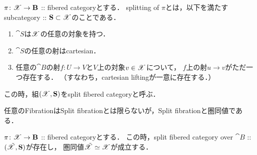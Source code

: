 \documentclass[a4paper, dvipdfmx]{jsarticle}
\begin{document}
    \begin{Def}
        $\pi \colon \mathscr{X} \to \mathbf{B}$ :: fibered categoryとする．
        splitting of $\pi$とは，以下を満たすsubcategory :: $\mathbf{S} \subset \mathscr{X}$のことである．
        \begin{enumerate}
            \item
                $\cat{S}$は$\mathscr{X}$の任意の対象を持つ．
            \item
                $\cat{S}$の任意の射はcartesian．
            \item
                任意の$\cat{B}$の射$f \colon U \to V$と$V$上の対象$v \in \mathscr{X}$について，
                $f$上の射$u \to v$がただ一つ存在する．
                （すなわち，cartesian liftingが一意に存在する．）
        \end{enumerate}
        この時，組$(\mathscr{X}, \mathbf{S})$をsplit fibered categoryと呼ぶ．
    \end{Def}

    任意のFibrationはSplit fibrationとは限らないが，Split fibrationと圏同値である．

    \begin{Thm}
        $\pi \colon \mathscr{X} \to \mathbf{B}$ :: fibered categoryとする．
        この時，split fibered category over $\cat{B}$ :: $(\tilde{\mathscr{X}}, \mathbf{S})$が存在し，
        圏同値$\tilde{\mathscr{X}} \overset{{}}{\simeq} \mathscr{X}$が成立する．
    \end{Thm}
\end{document}
